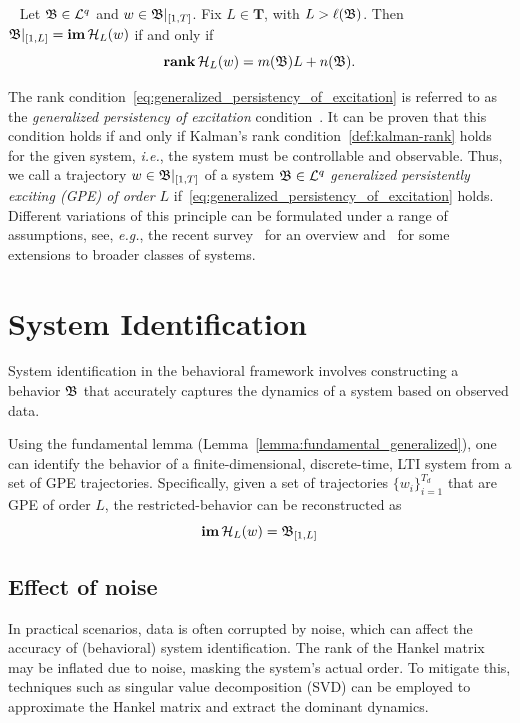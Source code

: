 \begin{lemma}~\cite[Corollary 19]{markovsky2020} \label{lemma:fundamental_generalized}
 Let ${\mathfrak{B} \in \mathcal{L}^{q}}$ and ${w \in \mathfrak{B}|_{[1,T]}}$. Fix $L\in\mathbf{T}$, with ${L > \ell(\mathfrak{B})}$. Then  $\mathfrak{B}|_{[1,L]} = \mathbf{im} \,  \mathcal{H}_L(w)$  if and only if
 \begin{equation}  \label{eq:generalized_persistency_of_excitation} 
 \mathbf{rank} \,  \mathcal{H}_L(w)   =  m(\mathfrak{B})L+ n(\mathfrak{B}).
 \end{equation}
 \end{lemma}

\noindent
The rank condition~\eqref{eq:generalized_persistency_of_excitation} is referred to as the \emph{generalized persistency of excitation} condition~\cite{markovsky2020}. It can be proven that this condition holds if and only if Kalman's rank condition~\ref{def:kalman-rank} holds for the given system, \emph{i.e.}, the system must be controllable and observable. Thus, we call a trajectory ${w \in \mathfrak{B}|_{[1,T]}}$ of a system ${\mathfrak{B} \in \mathcal{L}^{q}}$ \emph{generalized persistently exciting (GPE) of order $L$} if~\eqref{eq:generalized_persistency_of_excitation} holds. Different variations of this principle can be formulated under a range of assumptions, see, \textit{e.g.}, the recent survey~\cite{markovsky2021} for an overview and~\cite{padoan2022} for some extensions to broader classes of systems.

\newpage
\section{System Identification}

System identification in the behavioral framework involves constructing a behavior $\mathfrak{B}$ that accurately captures the dynamics of a system based on observed data. 

Using the fundamental lemma (Lemma~\ref{lemma:fundamental_generalized}), one can identify the behavior of a finite-dimensional, discrete-time, LTI system from a set of GPE trajectories. Specifically, given a set of trajectories ${\{w_i\}}_{i=1}^{T_d}$ that are GPE of order $L$, the restricted-behavior can be reconstructed as
\begin{equation}
   \mathbf{im} \, \mathcal{H}_L(w) = \mathfrak{B}_{[1,L]}
\end{equation} 

\subsection{Effect of noise}
In practical scenarios, data is often corrupted by noise, which can affect the accuracy of (behavioral) system identification. The rank of the Hankel matrix may be inflated due to noise, masking the system's actual order. To mitigate this, techniques such as singular value decomposition (SVD) can be employed to approximate the Hankel matrix and extract the dominant dynamics.

